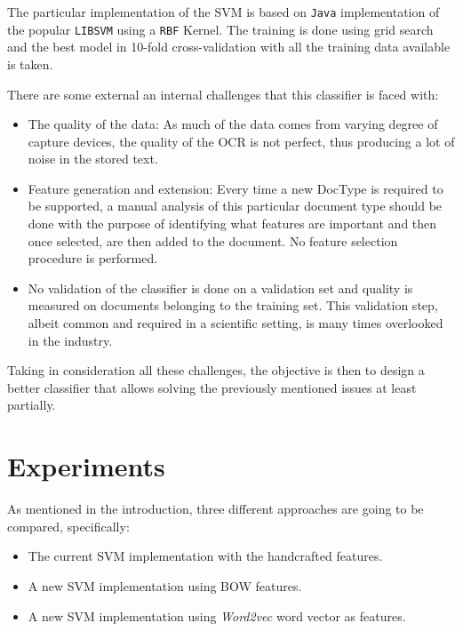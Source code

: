 The particular implementation of the \ac{SVM} is based on \texttt{Java}
implementation of the popular \texttt{LIBSVM} \cite{CC01a} using a
\texttt{RBF} Kernel.  The training is done using grid search and the best
model in 10-fold cross-validation with all the training data available is
taken.

There are some external an internal challenges that this classifier is faced
with:

\begin{itemize}
\item The quality of the data: As much of the data comes from varying degree
  of capture devices, the quality of the OCR is not perfect, thus producing a
  lot of noise in the stored text.
\item Feature generation and extension: Every time a new \ac{DocType} is
  required to be supported, a manual analysis of this particular document type should be
  done with the purpose of identifying what features are important and then
  once selected, are then added to the document. No feature selection
  procedure is performed.
\item No validation of the classifier is done on a validation set and quality
  is measured on documents belonging to the training set. This validation step, albeit common and required  in a scientific setting, is many times overlooked in
  the industry.
\end{itemize}

Taking in consideration all these challenges, the objective is then to design
a better classifier that allows solving  the previously mentioned issues at least partially.



\section{Experiments}
\label{sec:w2vec_doctype_experimental_setup}

As mentioned in the introduction, three different approaches are going to be
compared, specifically:

\begin{itemize}
\item The current \ac{SVM} implementation with the handcrafted features.
\item A new \ac{SVM} implementation using \ac{BOW} features.
\item A new \ac{SVM} implementation using \textit{Word2vec} word vector as features.
\end{itemize}

